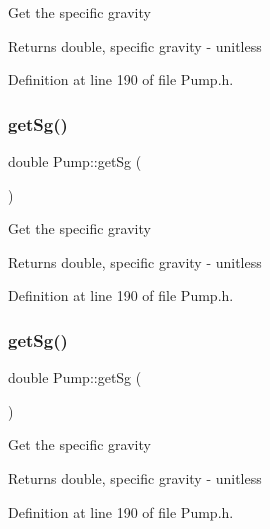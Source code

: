Get the specific gravity

\begin{DoxyReturn}{Returns}
double, specific gravity -\/ unitless 
\end{DoxyReturn}


Definition at line 190 of file Pump.\+h.

\mbox{\label{class_pump_ae30109b8533176cc1c7c80cf9df95631}} 
\subsubsection{\texorpdfstring{get\+Sg()}{getSg()}\hspace{0.1cm}{\footnotesize\ttfamily [2/3]}}
{\footnotesize\ttfamily double Pump\+::get\+Sg (\begin{DoxyParamCaption}{ }\end{DoxyParamCaption})\hspace{0.3cm}{\ttfamily [inline]}}

Get the specific gravity

\begin{DoxyReturn}{Returns}
double, specific gravity -\/ unitless 
\end{DoxyReturn}


Definition at line 190 of file Pump.\+h.

\mbox{\label{class_pump_ae30109b8533176cc1c7c80cf9df95631}} 
\subsubsection{\texorpdfstring{get\+Sg()}{getSg()}\hspace{0.1cm}{\footnotesize\ttfamily [3/3]}}
{\footnotesize\ttfamily double Pump\+::get\+Sg (\begin{DoxyParamCaption}{ }\end{DoxyParamCaption})\hspace{0.3cm}{\ttfamily [inline]}}

Get the specific gravity

\begin{DoxyReturn}{Returns}
double, specific gravity -\/ unitless 
\end{DoxyReturn}


Definition at line 190 of file Pump.\+h.

